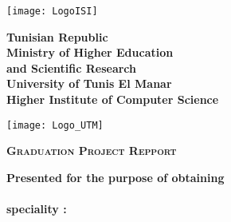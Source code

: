 


\thispagestyle{cover}%
\hspace{-47pt}
\begin{minipage}[l]{0.2\columnwidth}
    \vspace{6mm}
    \texttt{[image: LogoISI]}\\
\end{minipage}
\hfill
\begin{minipage}[l]{0.6\columnwidth}
    \centering
    \footnotesize
    \textbf{{Tunisian Republic}}\\
    \vspace{1.5mm}
    \textbf{{Ministry of Higher Education\\ and Scientific Research}}\\
    \vspace{1.5mm}
    \textbf{{University of Tunis El Manar}}\\
    \vspace{1.5mm}
    \textbf{{Higher Institute of Computer Science}}
\end{minipage}
\hfill
\begin{minipage}[l]{0.02\columnwidth}
\end{minipage}
\hfill
\begin{minipage}[l]{0.18\columnwidth}
    \vspace{6mm}
    \texttt{[image: Logo\_UTM]}\\
\end{minipage}
\vskip1.5cm

\begin{center}
    {\LARGE{\textbf{\textsc{Graduation Project Repport}}}}\\
    \vskip0.5cm
    \large

    {\textbf{Presented for the purpose of obtaining}}\\
    \vskip2mm
    {\textbf{\@diplomaName}}\\
    {\textbf{speciality : \@speciality}}\\
    {}
\end{center}

